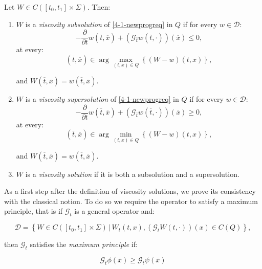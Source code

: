 \begin{definition}\label{4-1-defviscsol}
    Let $W\in C([t_0,t_1]\times\Sigma)$. Then:
    \begin{enumerate}
        \item $W$ is a \textit{viscosity subsolution} of \ref{4-1-newprogreq} in $Q$ if for every $w\in\mathcal{D}$:
        \begin{equation}\label{4-1-defsubsolution}
            -\frac{\partial}{\partial t}w\left(\overline{t},\overline{x}\right) + \left(\mathcal{G}_{\overline{t}}w\left(\overline{t},\cdot\right)\right)\left(\overline{x}\right) \leq 0,
        \end{equation} 
        at every:
        \[\left(\overline{t},\overline{x}\right)\in \arg \max_{(t,x)\in Q}\left\{(W-w)(t,x)\right\},\]

        and $W\left(\overline{t},\overline{x}\right)=w\left(\overline{t},\overline{x}\right)$.
        \item $W$ is a \textit{viscosity supersolution} of \ref{4-1-newprogreq} in $Q$ if for every $w\in\mathcal{D}$:
        \begin{equation}\label{4-1-defsupersolution}
            -\frac{\partial}{\partial t}w\left(\overline{t},\overline{x}\right) + \left(\mathcal{G}_{\overline{t}}w\left(\overline{t},\cdot\right)\right)\left(\overline{x}\right) \geq 0,
        \end{equation} 
        at every:
        \[\left(\overline{t},\overline{x}\right)\in \arg \min_{(t,x)\in Q}\left\{(W-w)(t,x)\right\},\]

        and $W\left(\overline{t},\overline{x}\right)=w\left(\overline{t},\overline{x}\right)$.
        \item $W$ is a \textit{viscosity solution} if it is both a subsolution and a supersolution.
    \end{enumerate}
\end{definition}

As a first step after the definition of viscosity solutions, we prove its consistency with the classical notion. To do so we require the 
operator to satisfy a maximum principle, that is if $\mathcal{G}_t$ is a general 
operator and:

\[\mathcal{D}=\left\{W\in C([t_0,t_1]\times\Sigma)\,|\,W_t(t,x),(\mathcal{G}_tW(t,\cdot))(x)\in C(Q)\right\},\]

then $\mathcal{G}_t$ satisfies the \textit{maximum principle} if:

\[\mathcal{G}_t\phi(\overline{x})\geq\mathcal{G}_t\psi(\overline{x})\]

